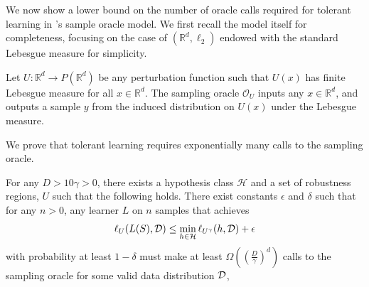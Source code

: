 We now show a lower bound on the number of oracle calls required for tolerant learning in \citet{Urner22}'s sample oracle model. We first recall the model itself for completeness, focusing on the case of $(\mathbb{R}^d,\ell_2)$ endowed with the standard Lebesgue measure for simplicity.
\begin{defn}
Let $U: \mathbb{R}^d \to P(\mathbb{R}^d)$ be any perturbation function such that $U(x)$ has finite Lebesgue measure for all $x \in \mathbb{R}^d$. The sampling oracle $\mathcal{O}_U$ inputs any $x \in \mathbb{R}^d$, and outputs a sample $y$ from the induced distribution on $U(x)$ under the Lebesgue measure.
\end{defn}
We prove that tolerant learning requires exponentially many calls to the sampling oracle.
\begin{customprop}{6}
For any $D>10\gamma > 0$, there exists a hypothesis class $\mathcal{H}$ and a set of robustness regions, $U$ such that the following holds. There exist constants $\epsilon$ and $\delta$ such that for any $n > 0$, any learner $L$ on $n$  samples that achieves 
$$\ell_U(L(S), \mathcal D) \leq \min_{h \in \mathcal H} \ell_{U^\gamma}(h, \mathcal D) + \epsilon$$
with probability at least $1-\delta$ must make at least $\Omega\left(\left(\frac{D}{\gamma}\right)^d\right)$ calls to the sampling oracle for some valid data distribution $\mathcal D$,
\end{customprop}
